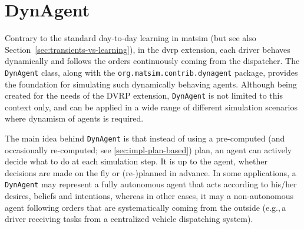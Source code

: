 \section{DynAgent}
\label{sec:dynAgent}
Contrary to the standard day-to-day learning in \gls{matsim} (but see also Section~\ref{sec:transients-vs-learning}), in the \gls{dvrp} extension, each driver behaves dynamically and follows the orders continuously coming from the dispatcher. The \lstinline$DynAgent$ class, along with the \lstinline$org.matsim.contrib.dynagent$ package, provides the foundation for simulating such dynamically behaving agents. Although  being created for the needs of the DVRP extension, \lstinline$DynAgent$ is not limited to this context only, and can be applied in a wide range of different simulation scenarios where dynamism of agents is required.

The main idea behind \lstinline$DynAgent$ is that instead of using a pre-computed (and occasionally re-computed; see \ref{sec:impl-plan-based}) plan, an agent can actively decide what to do at each simulation step. It is up to the agent, whether decisions are made on the fly or (re-)planned in advance. In some applications, a \lstinline$DynAgent$ may represent a fully autonomous agent that acts according to his/her desires, beliefs and intentions, whereas in other cases, it may a non-autonomous agent following orders that are systematically coming from the outside (e.g.,\,a driver receiving tasks from a centralized vehicle dispatching system).

